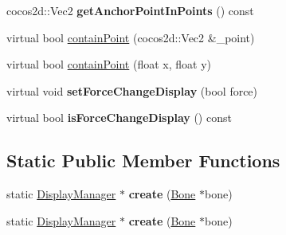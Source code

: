 \begin{DoxyCompactItemize}
\mbox{\label{classcocostudio_1_1DisplayManager_a2451ce1c25173657d632e5ef3bc216ef}} 
cocos2d\+::\+Vec2 {\bfseries get\+Anchor\+Point\+In\+Points} () const
\item 
virtual bool \hyperlink{classcocostudio_1_1DisplayManager_ae29e9c2724c2917efea6b6a584a3d7bd}{contain\+Point} (cocos2d\+::\+Vec2 \&\+\_\+point)
\item 
virtual bool \hyperlink{classcocostudio_1_1DisplayManager_a3606e657c355e28e72546e9b4a6c6ced}{contain\+Point} (float x, float y)
\item 
\mbox{\label{classcocostudio_1_1DisplayManager_a0aee8f48f41fe3079c6d0053d622b942}} 
virtual void {\bfseries set\+Force\+Change\+Display} (bool force)
\item 
\mbox{\label{classcocostudio_1_1DisplayManager_ac3b548fc4393d8c7fa6af3d871b70722}} 
virtual bool {\bfseries is\+Force\+Change\+Display} () const
\end{DoxyCompactItemize}
\subsection*{Static Public Member Functions}
\begin{DoxyCompactItemize}
\item 
\mbox{\label{classcocostudio_1_1DisplayManager_a14733953f8bda76c7b539ddbe625c1aa}} 
static \hyperlink{classcocostudio_1_1DisplayManager}{Display\+Manager} $\ast$ {\bfseries create} (\hyperlink{classcocostudio_1_1Bone}{Bone} $\ast$bone)
\item 
\mbox{\label{classcocostudio_1_1DisplayManager_a74a4cda05b2d4670a378dec63d9fe3ac}} 
static \hyperlink{classcocostudio_1_1DisplayManager}{Display\+Manager} $\ast$ {\bfseries create} (\hyperlink{classcocostudio_1_1Bone}{Bone} $\ast$bone)
\end{DoxyCompactItemize}
